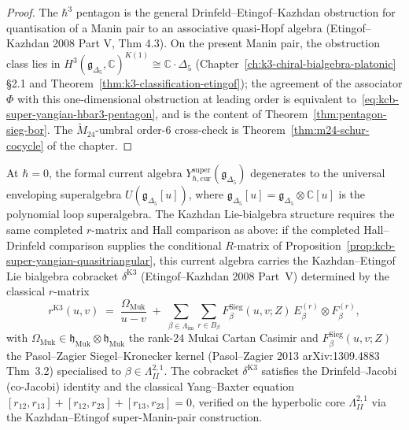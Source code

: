 \begin{proof}
The $\hbar^3$ pentagon is the general Drinfeld--Etingof--Kazhdan
obstruction for quantisation of a Manin pair to an associative
quasi-Hopf algebra (Etingof--Kazhdan 2008 Part V, Thm 4.3). On the
present Manin pair, the obstruction class lies in
$H^3(\mathfrak{g}_{\Delta_5},\mathbb{C})^{K(1)}\cong\mathbb{C}\cdot
\Delta_5$ (Chapter~\ref{ch:k3-chiral-bialgebra-platonic} \S2.1 and
Theorem~\ref{thm:k3-classification-etingof}); the agreement of the
associator $\Phi$ with this one-dimensional obstruction at leading
order is equivalent to~\eqref{eq:kcb-super-yangian-hbar3-pentagon},
and is the content of Theorem~\ref{thm:pentagon-sieg-bor}. The
$\widetilde{M}_{24}$-umbral order-$6$ cross-check is
Theorem~\ref{thm:m24-schur-cocycle} of the chapter.
\end{proof}

\begin{theorem}
\label{thm:kcb-classical-limit-kazhdan}
At $\hbar=0$, the formal current algebra
$Y_{\hbar,\mathrm{cur}}^{\mathrm{super}}(\mathfrak{g}_{\Delta_5})$
degenerates to the universal enveloping superalgebra
$U(\mathfrak{g}_{\Delta_5}[u])$, where
$\mathfrak{g}_{\Delta_5}[u] = \mathfrak{g}_{\Delta_5}\otimes
\mathbb{C}[u]$ is the polynomial loop superalgebra. The Kazhdan
Lie-bialgebra structure requires the same completed \(r\)-matrix and
Hall comparison as above: if the completed
Hall--Drinfeld comparison supplies the conditional \(R\)-matrix of
Proposition~\ref{prop:kcb-super-yangian-quasitriangular}, this current
algebra carries the Kazhdan--Etingof Lie bialgebra cobracket
$\delta^{\mathrm{K3}}$
(Etingof--Kazhdan 2008 Part~V) determined by the classical
$r$-matrix
\begin{equation}
\label{eq:kcb-classical-rmatrix}
 r^{\mathrm{K3}}(u,v)
 \;=\;
 \frac{\Omega_{\mathrm{Muk}}}{u-v}
 \;+\;
 \sum_{\beta\in\Lambda_{\mathrm{im}}}\sum_{r\in B_\beta}
 F^{\mathrm{Sieg}}_\beta(u,v;Z)\,
 E_\beta^{(r)}\otimes F_\beta^{(r)},
\end{equation}
with $\Omega_{\mathrm{Muk}}\in\mathfrak{h}_{\mathrm{Muk}}\otimes
\mathfrak{h}_{\mathrm{Muk}}$ the rank-$24$ Mukai Cartan Casimir and
$F^{\mathrm{Sieg}}_\beta(u,v;Z)$ the Pasol--Zagier Siegel--Kronecker
kernel (Pasol--Zagier 2013 \textup{arXiv:1309.4883} Thm~3.2) specialised
to $\beta\in\Lambda^{2,1}_{II}$. The cobracket
$\delta^{\mathrm{K3}}$ satisfies the Drinfeld--Jacobi (co-Jacobi)
identity and the classical Yang--Baxter equation
$[r_{12},r_{13}]+[r_{12},r_{23}]+[r_{13},r_{23}]=0$, verified on the
hyperbolic core $\Lambda^{2,1}_{II}$ via the Kazhdan--Etingof
super-Manin-pair construction.
\end{theorem}

